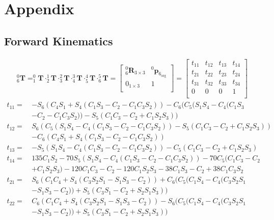 \chapter{Appendix}
\label{chapter8}
\section{Forward Kinematics}\label{appendix:forward}
\begin{equation*}
\begin{split}
^0_6 \mathbf{T} =
^0_1 \mathbf{T} \cdot ^1_2 \mathbf{T} \cdot ^2_3 \mathbf{T} \cdot ^3_4 \mathbf{T} \cdot ^4_5 \mathbf{T} \cdot ^5_6 \mathbf{T} =
\begin{bmatrix}
^0_6 \mathbf{R}_{3\times 3} 	&^0\!\boldsymbol{p}_\mathrm{6_{org}}\\
0_{1\times 3}				&1\\
\end{bmatrix}
=
\begin{bmatrix}
t_{11} 	&t_{12}	&t_{13}	& t_{14}\\
t_{21} 	&t_{22}	&t_{23}	& t_{24}\\
t_{31} 	&t_{32}	&t_{33}	& t_{34}\\
0					&0					&0					&1\\
\end{bmatrix}
\end{split}
\end{equation*}
\begin{equation*}
\begin{split}
t_{11} =\	&- S_6(C_4S_1 + S_4(C_1S_3-C_2 - C_1C_3S_2)) - C_6(C_5(S_1S_4 - C_4(C_1S_3\\
			&-C_2 - C_1C_3S_2)) - S_5(C_1C_3-C_2 + C_1S_2S_3))\\
t_{12} =\ 	&S_6(C_5(S_1S_4 - C_4(C_1S_3-C_2 - C_1C_3S_2)) - S_5(C_1C_3-C_2 + C_1S_2S_3))\\
		 	&- C_6(C_4S_1 + S_4(C_1S_3-C_2 - C_1C_3S_2))\\
t_{13} =\ 	&- S_5(S_1S_4 - C_4(C_1S_3-C_2 - C_1C_3S_2)) - C_5(C_1C_3-C_2 + C_1S_2S_3)\\
t_{14} =\ 	&135C_1S_2 - 70S_5(S_1S_4 - C_4(C_1S_3-C_2 - C_1C_3S_2)) - 70C_5(C_1C_3-C_2\\
		 	& + C_1S_2S_3) - 120C_1C_3-C_2 - 120C_1S_2S_3 - 38C_1S_3-C_2 + 38C_1C_3S_2\\
t_{21} =\ 	&S_6(C_1C_4 + S_4(C_3S_2S_1 - S_1S_3-C_2)) + C_6(C_5(C_1S_4 - C_4(C_3S_2S_1\\
		 	& - S_1S_3-C_2)) + S_5(C_3S_1-C_2 + S_2S_1S_3))\\
t_{22} =\ 	&C_6(C_1C_4 + S_4(C_3S_2S_1 - S_1S_3-C_2)) - S_6(C_5(C_1S_4 - C_4(C_3S_2S_1\\
		 	& - S_1S_3-C_2)) + S_5(C_3S_1-C_2 + S_2S_1S_3))\\
\end{split}
\end{equation*}
